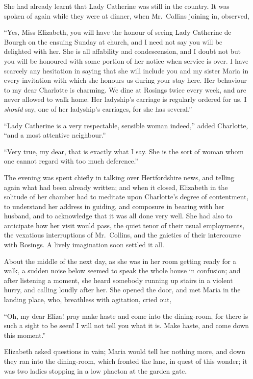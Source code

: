She had already learnt that Lady Catherine was still
in the country. It was spoken of again while they were
at dinner, when Mr.\ Collins joining in, observed,

“Yes, Miss Elizabeth, you will have the honour of
seeing Lady Catherine de Bourgh on the ensuing Sunday
at church, and I need not say you will be delighted with
her. She is all affability and condescension, and I doubt not
but you will be honoured with some portion of her notice
when service is over. I have scarcely any hesitation in saying
that she will include you and my sister Maria in every
invitation with which she honours us during your stay
here. Her behaviour to my dear Charlotte is charming.
We dine at Rosings twice every week, and are never
allowed to walk home. Her ladyship’s carriage is regularly
ordered for us. I \textit{should} say, one of her ladyship’s carriages,
for she has several.”

“Lady Catherine is a very respectable, sensible woman
indeed,” added Charlotte, “and a most attentive
neighbour.”

“Very true, my dear, that is exactly what I say. She
is the sort of woman whom one cannot regard with too
much deference.”

The evening was spent chiefly in talking over Hertfordshire
news, and telling again what had been already
written; and when it closed, Elizabeth in the solitude
of her chamber had to meditate upon Charlotte’s degree
of contentment, to understand her address in guiding,
and composure in bearing with her husband, and to
acknowledge that it was all done very well. She had also
to anticipate how her visit would pass, the quiet tenor
of their usual employments, the vexatious interruptions
of Mr.\ Collins, and the gaieties of their intercourse with
Rosings. A lively imagination soon settled it all.

About the middle of the next day, as she was in her
room getting ready for a walk, a sudden noise below
seemed to speak the whole house in confusion; and after
listening a moment, she heard somebody running up stairs
in a violent hurry, and calling loudly after her. She
opened the door, and met Maria in the landing place, who,
breathless with agitation, cried out,

“Oh, my dear Eliza! pray make haste and come
into the dining-room, for there is such a sight to be seen!
I will not tell you what it is. Make haste, and come down
this moment.”

Elizabeth asked questions in vain; Maria would tell
her nothing more, and down they ran into the dining-room,
which fronted the lane, in quest of this wonder;
it was two ladies stopping in a low phaeton at the garden
gate.

